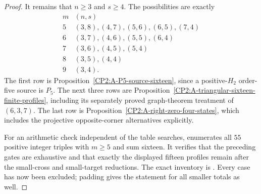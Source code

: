 \begin{proof}
It remains that $n\geq3$ and $s\geq4$. The possibilities
are exactly
\[
\begin{array}{c|l}
 m& (n,s)\\\hline
5&(3,8),(4,7),(5,6),(6,5),(7,4)\\
6&(3,7),(4,6),(5,5),(6,4)\\
7&(3,6),(4,5),(5,4)\\
8&(3,5),(4,4)\\
9&(3,4).
\end{array}
\]
The first row is Proposition~\ref{CP2:A-P5-source-sixteen},
since a positive-$H_2$ order-five source is $P_5$.
The next three rows are
Proposition~\ref{CP2:A-triangular-sixteen-finite-profiles},
including its separately proved graph-theorem treatment of
$(6,3,7)$. The last row is
Proposition~\ref{CP2:A-right-zero-four-states}, which includes
the projective opposite-corner alternatives explicitly.

For an arithmetic check independent of the table searches,
 enumerates all
$55$ positive integer triples with $m\geq5$ and sum sixteen.
It verifies that the preceding gates are exhaustive and that
exactly the displayed fifteen profiles remain after the
small-cross and small-target reductions. The exact inventory
is .
Every case has now been excluded; padding gives the statement
for all smaller totals as well.
\end{proof}
